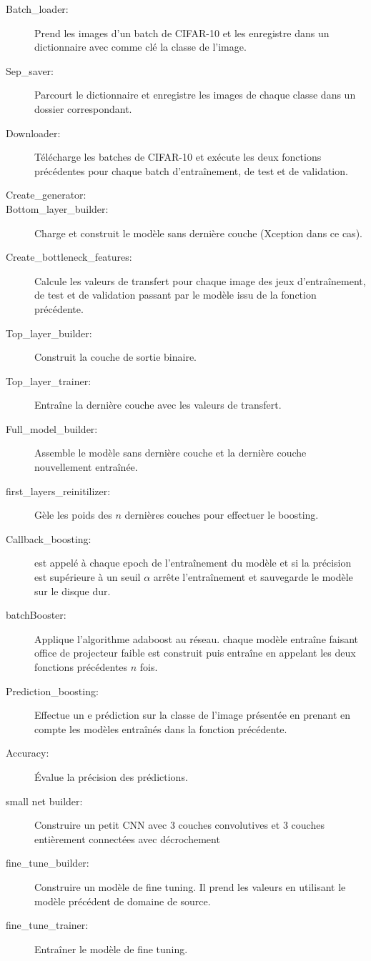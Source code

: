\documentclass[11 pt]{article}
\begin{document}
\begin{appendices}
  \begin{description}
    \item[Batch\_loader:] Prend les images d'un batch de CIFAR-10 et les enregistre dans un dictionnaire avec comme clé la classe de l'image.
    \item[Sep\_saver:] Parcourt le dictionnaire et enregistre les images de chaque classe dans un dossier correspondant.
    \item[Downloader:] Télécharge les batches de CIFAR-10 et exécute les deux fonctions précédentes pour chaque batch d’entraînement, de test et de validation.
    \item[Create\_generator:]
    \item[Bottom\_layer\_builder:] Charge et construit le modèle sans dernière couche (Xception dans ce cas).
    \item[Create\_bottleneck\_features:] Calcule les valeurs de transfert pour chaque image des jeux d’entraînement, de test et de validation passant par le modèle issu de la fonction précédente.
    \item[Top\_layer\_builder:] Construit la couche de sortie binaire.
    \item[Top\_layer\_trainer:] Entraîne la dernière couche avec les valeurs de transfert.
    \item[Full\_model\_builder:] Assemble le modèle sans dernière couche et la dernière couche nouvellement entraînée.
    \item[first\_layers\_reinitilizer:] Gèle les poids des $n$ dernières couches pour effectuer le boosting.
    \item[Callback\_boosting:] est appelé à chaque epoch de l’entraînement du modèle et si la précision est supérieure à un seuil $\alpha$ arrête l'entraînement et sauvegarde le modèle sur le disque dur.
    \item[batchBooster:] Applique l'algorithme adaboost au réseau. chaque modèle entraîne faisant office de projecteur faible est construit puis entraîne en appelant les deux fonctions précédentes $n$ fois.
    \item[Prediction\_boosting:] Effectue un e prédiction sur la classe de l'image présentée en prenant en compte les modèles entraînés dans la fonction précédente.
    \item[Accuracy:] Évalue la précision des prédictions.
    \item[small net builder:] Construire un petit CNN avec 3 couches convolutives et 3 couches entièrement connectées avec décrochement
    \item[fine\_tune\_builder:] Construire un modèle de fine tuning. Il prend les valeurs en utilisant le modèle précédent de domaine de source.
    \item[fine\_tune\_trainer:] Entraîner le modèle de fine tuning.
  \end{description}
\end{appendices}
\end{document}
